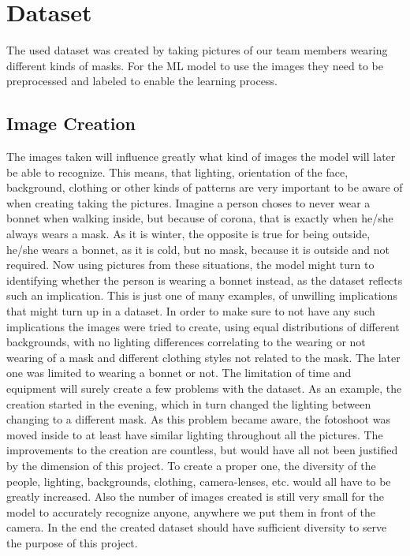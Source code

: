 \section{Dataset}

The used dataset was created by taking pictures of our team members wearing
different kinds of masks. For the ML model to use the images they need to be
preprocessed and labeled to enable the learning process.

\subsection{Image Creation}

The images taken will influence greatly what kind of images the model will later
be able to recognize. This means, that lighting, orientation of the face,
background, clothing or other kinds of patterns are very important to be aware
of when creating taking the pictures. 
\newline
Imagine a person choses to never wear a bonnet when walking inside, but because
of corona, that is exactly when he/she always wears a mask. As it is winter, the
opposite is true for being outside, he/she wears a bonnet, as it is cold, but no
mask, because it is outside and not required. Now using pictures from these
situations, the model might turn to identifying whether the person is wearing a
bonnet instead, as the dataset reflects such an implication. This is just one of
many examples, of unwilling implications that might turn up in a dataset.
\newline
In order to make sure to not have any such implications the images were tried to
create, using equal distributions of different backgrounds, with no lighting
differences correlating to the wearing or not wearing of a mask and different
clothing styles not related to the mask. The later one was limited to wearing a
bonnet or not.
\newline
The limitation of time and equipment will surely create a few problems with the
dataset. As an example, the creation started in the evening, which in turn
changed the lighting between changing to a different mask. As this problem
became aware, the fotoshoot was moved inside to at least have similar lighting
throughout all the pictures.
\newline
The improvements to the creation are countless, but would have all not been
justified by the dimension of this project. To create a proper one, the
diversity of the people, lighting, backgrounds, clothing, camera-lenses, etc.
would all have to be greatly increased. Also the number of images created is
still very small for the model to accurately recognize anyone, anywhere we put
them in front of the camera. In the end the created dataset should have
sufficient diversity to serve the purpose of this project.

